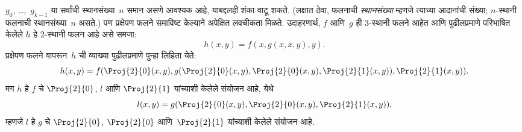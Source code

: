 \documentclass[../../../include/open-logic-section]{subfiles}
\begin{document}
$g_0$, \dots,~$g_{k-1}$ या सर्वांची स्थानसंख्या~$n$ समान असणे आवश्यक
आहे, याबद्दलही शंका वाटू शकते. (लक्षात ठेवा, फलनाची \emph{स्थानसंख्या}
म्हणजे त्याच्या आदानांची संख्या; $n$-स्थानी फलनाची स्थानसंख्या~$n$
असते.) पण प्रक्षेपण फलने समाविष्ट केल्याने अपेक्षित लवचीकता मिळते.
उदाहरणार्थ, $f$ आणि~$g$ ही $3$-स्थानी फलने आहेत आणि पुढीलप्रमाणे
परिभाषित केलेले $h$ हे $2$-स्थानी फलन आहे असे समजा:
\[
h(x,y) = f(x,g(x,x,y),y).
\]
प्रक्षेपण फलने वापरून~$h$ ची व्याख्या पुढीलप्रमाणे पुन्हा लिहिता येते:
\[
h(x,y) = f(\Proj{2}{0}(x,y), g(\Proj{2}{0}(x,y), \Proj{2}{0}(x,y),
\Proj{2}{1}(x,y)), \Proj{2}{1}(x,y)).
\]
मग $h$ हे $f$ चे $\Proj{2}{0}$, $l$ आणि $\Proj{2}{1}$ यांच्याशी
केलेले संयोजन आहे, येथे
\[
l(x,y) = g(\Proj{2}{0}(x,y),\Proj{2}{0}(x,y),\Proj{2}{1}(x,y)),
\]
म्हणजे $l$ हे $g$ चे $\Proj{2}{0}$, $\Proj{2}{0}$ आणि~$\Proj{2}{1}$
यांच्याशी केलेले संयोजन आहे.
\end{document}
